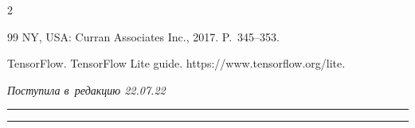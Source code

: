 \begin{multicols}{2}
{{\begin{thebibliography}{99}
NY, USA: Curran Associates Inc., 2017. P.~345--353.




TensorFlow. TensorFlow Lite guide. {\sf https://www.\linebreak tensorflow.org/lite}.


\end{thebibliography}





 }


 }





\end{multicols}





\vspace*{-7pt}





\hfill{\small\textit{Поступила в~редакцию 22.07.22}}





\vspace*{6pt}




















\hrule





\vspace*{2pt}





\hrule





\vspace*{-2pt}












